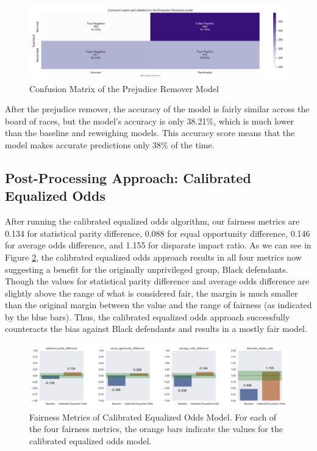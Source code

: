\documentclass[water,article,submit,moreauthors,pdftex]{mdpi}
\begin{document}
\begin{figure}

{\centering \includegraphics[width=1\linewidth]{../images/prejudice_matrix} 

}

\caption{Confusion Matrix of the Prejudice Remover Model}\label{fig:prejudice matrix}
\end{figure}

After the prejudice remover, the accuracy of the model is fairly similar
across the board of races, but the model's accuracy is only 38.21\%,
which is much lower than the baseline and reweighing models. This
accuracy score means that the model makes accurate predictions only 38\%
of the time.

\hypertarget{post-processing-approach-calibrated-equalized-odds}{%
\subsection{Post-Processing Approach: Calibrated Equalized
Odds}\label{post-processing-approach-calibrated-equalized-odds}}

After running the calibrated equalized odds algorithm, our fairness
metrics are 0.134 for statistical parity difference, 0.088 for equal
opportunity difference, 0.146 for average odds difference, and 1.155 for
disparate impact ratio. As we can see in Figure \ref{fig:ceo metrics},
the calibrated equalized odds approach results in all four metrics now
suggesting a benefit for the originally unprivileged group, Black
defendants. Though the values for statistical parity difference and
average odds difference are slightly above the range of what is
considered fair, the margin is much smaller than the original margin
between the value and the range of fairness (as indicated by the blue
bars). Thus, the calibrated equalized odds approach successfully
counteracts the bias against Black defendants and results in a mostly
fair model.

\begin{figure}

{\centering \includegraphics[width=1\linewidth]{../images/calibrated_equalized_odds_metrics} 

}

\caption{Fairness Metrics of Calibrated Equalized Odds Model. For each of the four fairness metrics, the orange bars indicate the values for the calibrated equalized odds model.}\label{fig:ceo metrics}
\end{figure}
\end{document}
